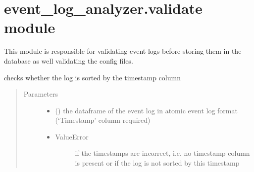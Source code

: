 \documentclass[letterpaper,10pt,english]{sphinxmanual}
\begin{document}
\section{event\_log\_analyzer.validate module}
\label{\detokenize{event_log_analyzer:module-event_log_analyzer.validate}}\label{\detokenize{event_log_analyzer:event-log-analyzer-validate-module}}
\sphinxAtStartPar
This module is responsible for validating event logs before storing them in the database as well validating the config files.

\begin{fulllineitems}
\label{\detokenize{event_log_analyzer:event_log_analyzer.validate.validate}}
\sphinxAtStartPar
checks whether the log is sorted by the timestamp column
\begin{quote}\begin{description}
\item[{Parameters}] \leavevmode\begin{itemize}
\item {} 
\sphinxAtStartPar
{} () \textendash{} the dataframe of the event log in atomic event log format (‘Timestamp’ column required)

\item {} 
\sphinxAtStartPar
{} \textendash{} \begin{description}
\item[{ValueError}] \leavevmode
\sphinxAtStartPar
if the timestamps are incorrect, i.e. no timestamp column is present or if the log is not sorted by this timestamp

\end{description}


\end{itemize}

\end{description}\end{quote}

\end{fulllineitems}
\end{document}
